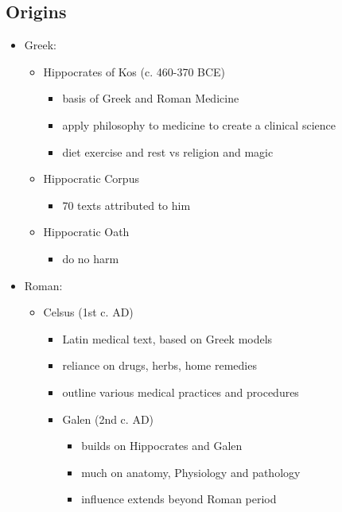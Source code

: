 \documentclass[12pt, twoside]{article}
\begin{document}
\subsection{Origins}
\begin{itemize}
\item Greek:
	\begin{itemize}
	\item Hippocrates of Kos (c. 460-370 BCE)
		\begin{itemize}
		\item basis of Greek and Roman Medicine
		\item apply philosophy to medicine to create a clinical science
		\item diet exercise and rest vs religion and magic
		\end{itemize}
	\item Hippocratic Corpus
		\begin{itemize}
		\item 70 texts attributed to him	
		\end{itemize}
	\item Hippocratic Oath
		\begin{itemize}
		\item do no harm
		\end{itemize}
	\end{itemize}	
\item Roman:
	\begin{itemize}
	\item Celsus (1st c. AD)
		\begin{itemize}
		\item Latin medical text, based on Greek models
		\item reliance on drugs, herbs, home remedies
		\item outline various medical practices and procedures
	\item Galen (2nd c. AD)
		\begin{itemize}
		\item builds on Hippocrates and Galen
		\item much on anatomy, Physiology and pathology
		\item influence extends beyond Roman period
		\end{itemize}
	\end{itemize}
\end{itemize}


\end{itemize}
\end{document}
